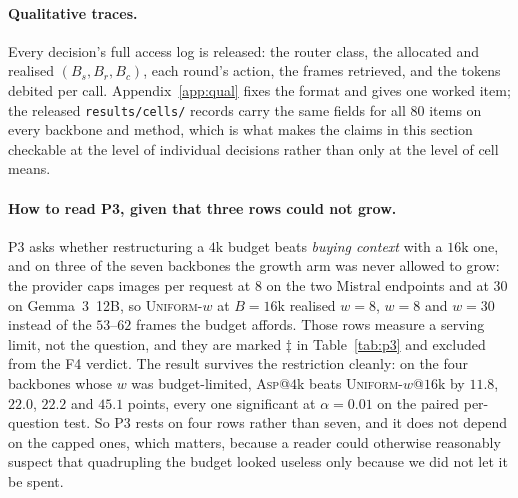 \documentclass[10pt]{article}
\newcommand{\VnTotal}{80}
\theoremstyle{definition}
\theoremstyle{plain}
\newcommand{\ASP}{\textsc{Asp}}
\begin{document}
\paragraph{Qualitative traces.} Every decision's full access log is released: the router class, the allocated and realised $(B_s,B_r,B_c)$, each round's action, the frames retrieved, and the tokens debited per call. Appendix~\ref{app:qual} fixes the format and gives one worked item; the released \texttt{results/cells/} records carry the same fields for all \VnTotal{} items on every backbone and method, which is what makes the claims in this section checkable at the level of individual decisions rather than only at the level of cell means.

\paragraph{How to read P3, given that three rows could not grow.} P3 asks whether restructuring
a $4$k budget beats \emph{buying context} with a $16$k one, and on three of the seven backbones
the growth arm was never allowed to grow: the provider caps images per request at $8$ on the two
Mistral endpoints and at $30$ on Gemma~3~12B, so \textsc{Uniform-}$w$ at $B{=}16$k realised
$w{=}8$, $w{=}8$ and $w{=}30$ instead of the $53$--$62$ frames the budget affords. Those rows
measure a serving limit, not the question, and they are marked $\ddagger$ in
Table~\ref{tab:p3} and excluded from the F4 verdict. The result survives the restriction
cleanly: on the four backbones whose $w$ was budget-limited, \ASP{}@$4$k beats
\textsc{Uniform-}$w$@$16$k by $11.8$, $22.0$, $22.2$ and $45.1$ points, every one significant at
$\alpha{=}0.01$ on the paired per-question test. So P3 rests on four rows rather than seven, and
it does not depend on the capped ones, which matters, because a reader could otherwise
reasonably suspect that quadrupling the budget looked useless only because we did not let it be
spent.
\end{document}
